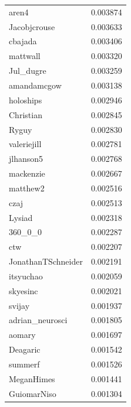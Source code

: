 \documentclass[9pt,lineno]{elife}
\begin{document}
\begin{appendixbox}
\begin{longtable}{lr}
aren4                      &                  0.003874 \\
Jacobjcrouse               &                  0.003633 \\
cbajada                    &                  0.003406 \\
mattwall                   &                  0.003320 \\
Jul\_dugre                  &                  0.003259 \\
amandamcgow                &                  0.003138 \\
holoships                  &                  0.002946 \\
Christian                  &                  0.002845 \\
Ryguy                      &                  0.002830 \\
valeriejill                &                  0.002781 \\
jlhanson5                  &                  0.002768 \\
mackenzie                  &                  0.002667 \\
matthew2                   &                  0.002516 \\
czaj                       &                  0.002513 \\
Lysiad                     &                  0.002318 \\
360\_0\_0                    &                  0.002287 \\
ctw                        &                  0.002207 \\
JonathanTSchneider         &                  0.002191 \\
itsyuchao                  &                  0.002059 \\
skyesinc                   &                  0.002021 \\
svijay                     &                  0.001937 \\
adrian\_neurosci            &                  0.001805 \\
aomary                     &                  0.001697 \\
Deagaric                   &                  0.001542 \\
summerf                    &                  0.001526 \\
MeganHimes                 &                  0.001441 \\
GuiomarNiso                &                  0.001304 \\

\end{longtable}
\end{appendixbox}
\end{document}
